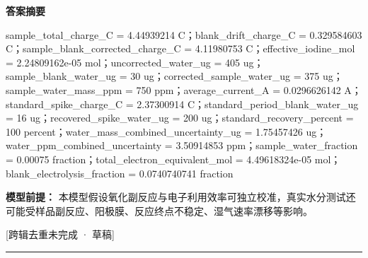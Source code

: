 \documentclass[UTF8,11pt,a4paper]{ctexart}
\begin{document}
\noindent\textbf{答案摘要}\par
sample\_total\_charge\_C = 4.44939214 C；blank\_drift\_charge\_C = 0.329584603 C；sample\_blank\_corrected\_charge\_C = 4.11980753 C；effective\_iodine\_mol = 2.24809162e-05 mol；uncorrected\_water\_ug = 405 ug；sample\_blank\_water\_ug = 30 ug；corrected\_sample\_water\_ug = 375 ug；sample\_water\_mass\_ppm = 750 ppm；average\_current\_A = 0.0296626142 A；standard\_spike\_charge\_C = 2.37300914 C；standard\_period\_blank\_water\_ug = 16 ug；recovered\_spike\_water\_ug = 200 ug；standard\_recovery\_percent = 100 percent；water\_mass\_combined\_uncertainty\_ug = 1.75457426 ug；water\_ppm\_combined\_uncertainty = 3.50914853 ppm；sample\_water\_fraction = 0.00075 fraction；total\_electron\_equivalent\_mol = 4.49618324e-05 mol；blank\_electrolysis\_fraction = 0.0740740741 fraction\par
\noindent\textbf{模型前提：}
本模型假设氧化副反应与电子利用效率可独立校准，真实水分测试还可能受样品副反应、阳极膜、反应终点不稳定、湿气速率漂移等影响。\par
\noindent\textcolor{red!65!black}{[跨辑去重未完成 · 草稿]} \par
\medskip\hrule\medskip
{}
\end{document}
